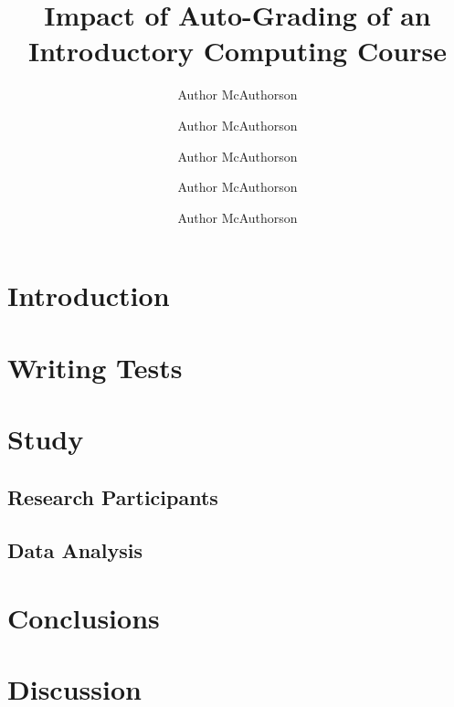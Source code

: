 \documentclass[12pt]{amsart}
\title{Impact of Auto-Grading of an Introductory Computing Course}
\author{Author McAuthorson \and Author McAuthorson \and Author McAuthorson \and Author McAuthorson \and Author McAuthorson}
\begin{document}
\maketitle

\section{Introduction} %
\section{Writing Tests} %
\section{Study} %
\subsection{Research Participants}  %
\subsection{Data Analysis}  %
\section{Conclusions}
\section{Discussion}
\end{document}
